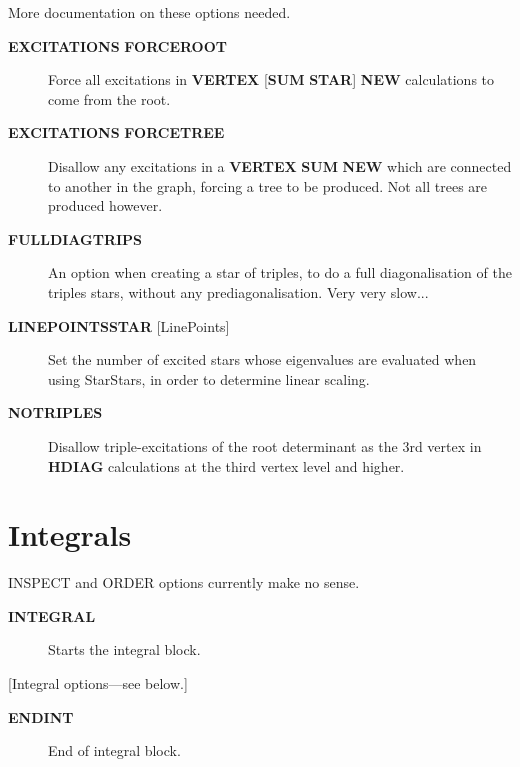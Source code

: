 \documentclass[openany,a4paper,10pt]{manual}
\begin{document}
\begin{notice}[note]
More documentation on these options needed.
\end{notice}
\begin{description}
\item[\textbf{EXCITATIONS} \textbf{FORCEROOT}]
Force all excitations in \textbf{VERTEX} {[}\textbf{SUM} \textbf{STAR}{]} \textbf{NEW}
calculations to come from the root.

\item[\textbf{EXCITATIONS} \textbf{FORCETREE}]
Disallow any excitations in a \textbf{VERTEX} \textbf{SUM} \textbf{NEW} which are
connected to another in the graph, forcing a tree to be produced.
Not all trees are produced however.

\item[\textbf{FULLDIAGTRIPS}]
An option when creating a star of triples, to do a
full diagonalisation of the triples stars, without any
prediagonalisation. Very very slow...

\item[\textbf{LINEPOINTSSTAR} {[}LinePoints{]}]
Set the number of excited stars whose eigenvalues are evaluated when
using StarStars, in order to determine linear scaling.

\item[\textbf{NOTRIPLES}]
Disallow triple-excitations of the root determinant as the 3rd vertex
in \textbf{HDIAG} calculations at the third vertex level and higher.

\end{description}

\resetcurrentobjects


\hypertarget{input-integrals}{}\section{Integrals}

\begin{notice}[note]
INSPECT and ORDER options currently make no sense.
\end{notice}
\begin{description}
\item[\textbf{INTEGRAL}]
Starts the integral block.

\end{description}

{[}Integral options---see below.{]}
\begin{description}
\item[\textbf{ENDINT}]
End of integral block.

\end{description}
\end{document}

